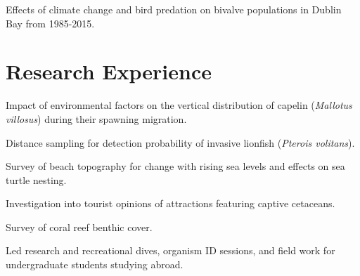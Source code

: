 \documentclass[a4paper]{deedy-resume} %
\begin{document}
\sectionspace %

Effects of climate change and bird predation on bivalve populations in Dublin Bay from 1985-2015.
\sectionspace %


\sectionspace %
\sectionspace %


\section{Research Experience}


Impact of environmental factors on the vertical distribution of capelin (\textit{Mallotus villosus}) during their spawning migration.

\sectionspace %



\begin{tightitemize}
\item Distance sampling for detection probability of invasive lionfish (\textit{Pterois volitans}).
\item Survey of beach topography for change with rising sea levels and effects on sea turtle nesting.
\item Investigation into tourist opinions of attractions featuring captive cetaceans.
\item Survey of coral reef benthic cover.
\item Led research and recreational dives, organism ID sessions, and field work for undergraduate students studying abroad.
\end{tightitemize}
\end{document}
